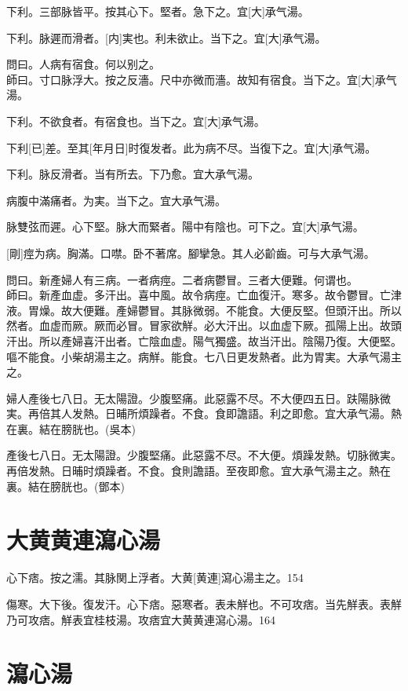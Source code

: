 \documentclass[12pt,oneside,UTF8,b5paper]{ctexbook}她她她她她她她
\begin{document}
下利。三部脉皆平。按其心下。堅者。急下之。宜[大]承气湯。

下利。脉遲而滑者。[内]実也。利未欲止。当下之。宜[大]承气湯。

問曰。人病有宿食。何以别之。\\
師曰。寸口脉浮大。按之反濇。尺中亦微而濇。故知有宿食。当下之。宜[大]承气湯。

下利。不欲食者。有宿食也。当下之。宜[大]承气湯。

下利[已]差。至其[年月日]时復发者。此为病不尽。当復下之。宜[大]承气湯。

下利。脉反滑者。当有所去。下乃愈。宜大承气湯。

病腹中滿痛者。为実。当下之。宜大承气湯。

脉雙弦而遲。心下堅。脉大而緊者。陽中有陰也。可下之。宜[大]承气湯。

[剛]痙为病。胸滿。口噤。卧不著席。腳攣急。其人必齘齒。可与大承气湯。

問曰。新產婦人有三病。一者病痙。二者病鬱冒。三者大便難。何谓也。\\
師曰。新產血虚。多汗出。喜中風。故令病痙。亡血復汗。寒多。故令鬱冒。亡津液。胃燥。故大便難。產婦鬱冒。其脉微弱。不能食。大便反堅。但頭汗出。所以然者。血虚而厥。厥而必冒。冒家欲觧。必大汗出。以血虚下厥。孤陽上出。故頭汗出。所以產婦喜汗出者。亡陰血虚。陽气獨盛。故当汗出。陰陽乃復。大便堅。嘔不能食。小柴胡湯主之。病觧。能食。七八日更发熱者。此为胃実。大承气湯主之。

婦人產後七八日。无太陽證。少腹堅痛。此惡露不尽。不大便四五日。趺陽脉微実。再倍其人发熱。日晡所煩躁者。不食。食即譫語。利之即愈。宜大承气湯。熱在裏。結在膀胱也。(吳本)

產後七八日。无太陽證。少腹堅痛。此惡露不尽。不大便。煩躁发熱。切脉微実。再倍发熱。日晡时煩躁者。不食。食則譫語。至夜即愈。宜大承气湯主之。熱在裏。結在膀胱也。(鄧本)

\section{大黄黄連瀉心湯}

心下痞。按之濡。其脉関上浮者。大黄[黄連]瀉心湯主之。154

傷寒。大下後。復发汗。心下痞。惡寒者。表未觧也。不可攻痞。当先觧表。表觧乃可攻痞。觧表宜桂枝湯。攻痞宜大黄黄連瀉心湯。164

\section{瀉心湯}
\end{document}
